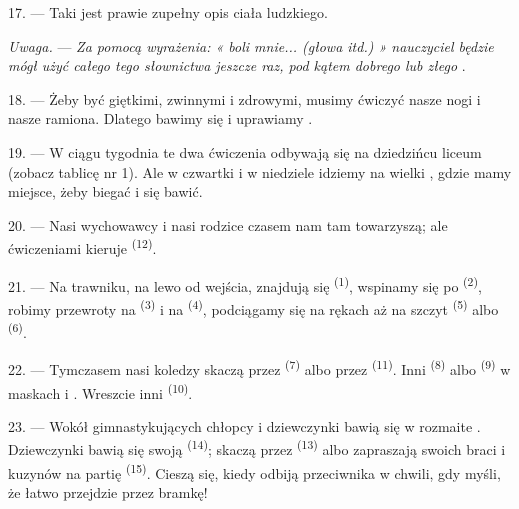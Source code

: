 17. --- Taki jest prawie zupełny opis ciała ludzkiego.

\textit{Uwaga.} --- \textit{Za pomocą wyrażenia: « boli mnie... (głowa itd.) »
nauczyciel będzie mógł użyć całego tego słownictwa jeszcze raz, pod kątem dobrego lub
złego} .

\VUsaut{5.0mm}
\VUsaut{2.4mm}
\VUsaut{3.0mm}

18. --- Żeby być giętkimi, zwinnymi i zdrowymi, musimy ćwiczyć nasze nogi i nasze
ramiona. Dlatego bawimy się i uprawiamy .

19. --- W ciągu tygodnia te dwa ćwiczenia odbywają się na dziedzińcu liceum (zobacz
tablicę nr 1). Ale w czwartki i w niedziele idziemy na wielki , gdzie
mamy miejsce, żeby biegać i się bawić.

20. --- Nasi wychowawcy i nasi rodzice czasem nam tam towarzyszą; ale ćwiczeniami
kieruje \textsuperscript{(12)}.

21. --- Na trawniku, na lewo od wejścia, znajdują się \textsuperscript{(1)}, wspinamy się po \textsuperscript{(2)},
robimy przewroty na \textsuperscript{(3)} i na
\textsuperscript{(4)}, podciągamy się na rękach aż na szczyt
\textsuperscript{(5)} albo \textsuperscript{(6)}.

22. --- Tymczasem nasi koledzy skaczą przez \textsuperscript{(7)} albo przez \textsuperscript{(11)}. Inni \textsuperscript{(8)} albo
\textsuperscript{(9)} w maskach i . Wreszcie inni
\textsuperscript{(10)}.

\VUsaut{4.6mm}
\VUsaut{3.0mm}

23. --- Wokół gimnastykujących chłopcy i dziewczynki bawią się w rozmaite
. Dziewczynki bawią się swoją \textsuperscript{(14)};
skaczą przez \textsuperscript{(13)} albo zapraszają swoich braci i
kuzynów na partię \textsuperscript{(15)}. Cieszą się, kiedy odbiją
 przeciwnika w chwili, gdy myśli, że łatwo przejdzie przez bramkę!

